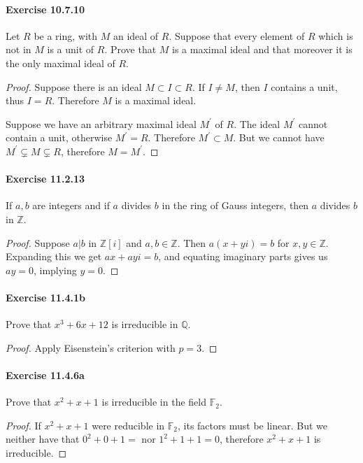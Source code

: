 \documentclass{article}
\begin{document}
\paragraph{Exercise 10.7.10} Let $R$ be a ring, with $M$ an ideal of $R$. Suppose that every element of $R$ which is not in $M$ is a unit of $R$. Prove that $M$ is a maximal ideal and that moreover it is the only maximal ideal of $R$.
\begin{proof}
Suppose there is an ideal $M\subset I\subset R$. If $I\neq M$, then $I$ contains a unit, thus $I=R$. Therefore $M$ is a maximal ideal. 

Suppose we have an arbitrary maximal ideal $M^\prime$ of $R$. The ideal $M^\prime$ cannot contain a unit, otherwise $M^\prime =R$. Therefore $M^\prime \subset M$. But we cannot have $M^\prime \subsetneq M \subsetneq R$, therefore $M=M^\prime$. 
\end{proof}



\paragraph{Exercise 11.2.13} If $a, b$ are integers and if $a$ divides $b$ in the ring of Gauss integers, then $a$ divides $b$ in $\mathbb{Z}$.
\begin{proof}
    Suppose $a|b$ in $\mathbb{Z}[i]$ and $a,b\in\mathbb{Z}$. Then $a(x+yi)=b$ for $x,y\in\mathbb{Z}$. Expanding this we get $ax+ayi=b$, and equating imaginary parts gives us $ay=0$, implying $y=0$. 
\end{proof}


\paragraph{Exercise 11.4.1b} Prove that $x^3 + 6x + 12$ is irreducible in $\mathbb{Q}$.
\begin{proof}
    Apply Eisenstein's criterion with $p=3$. 
\end{proof}



\paragraph{Exercise 11.4.6a} Prove that $x^2+x+1$ is irreducible in the field $\mathbb{F}_2$.
\begin{proof}
    If $x^2+x+1$ were reducible in $\mathbb{F}_2$, its factors must be linear. But we neither have that $0^2+0+1=$ nor $1^2+1+1=0$, therefore $x^2+x+1$ is irreducible.  
\end{proof}
\end{document}
